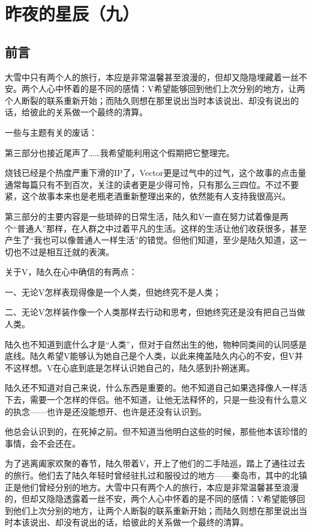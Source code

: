 \chapter{昨夜的星辰（九）}

\section*{前言}

大雪中只有两个人的旅行，本应是非常温馨甚至浪漫的，但却又隐隐埋藏着一丝不安。两个人心中怀着的是不同的感情：V希望能够回到他们上次分别的地方，让两个人断裂的联系重新开始；而陆久则想在那里说出当时本该说出、却没有说出的话，给彼此的关系做一个最终的清算。

\lineseparator

一些与主题有关的废话：

第三部分也接近尾声了……我希望能利用这个假期把它整理完。

烧钱已经是个热度严重下滑的IP了，Vector更是过气中的过气，这个故事的点击量通常每篇只有不到百次，关注的读者更是少得可怜，只有那么三四位。不过不要紧，这个故事本来也是老瓶老酒重新整理出来的，依然能有人支持我很高兴。

第三部分的主要内容是一些琐碎的日常生活，陆久和V一直在努力试着像是两个“普通人”那样，在人群之中过着平凡的生活。这样的生活让他们收获很多，甚至产生了“我也可以像普通人一样生活”的错觉。但他们知道，至少是陆久知道，这一切也不过是相互迁就的表演。

关于V，陆久在心中确信的有两点：

一、无论V怎样表现得像是一个人类，但她终究不是人类；

二、无论V怎样装作像一个人类那样去行动和思考，但她终究还是没有把自己当做人类。

陆久也不知道到底什么才是“人类”，但对于自然出生的他，物种同类间的认同感是底线。陆久希望V能够认为她自己是个人类，以此来掩盖陆久内心的不安，但V并不这样想。V在心底到底是怎样认识她自己的，陆久感到扑朔迷离。

陆久还不知道对自己来说，什么东西是重要的。他不知道自己如果选择像人一样活下去，需要一个怎样的伴侣。他不知道，让他无法释怀的，只是一些没有什么意义的执念——也许是还没能想开、也许是还没有认识到。

他总会认识到的，在死掉之前。但不知道当他明白这些的时候，那些他本该珍惜的事情，会不会还在。

为了逃离阖家欢聚的春节，陆久带着V，开上了他们的二手陆巡，踏上了通往过去的旅行。他们去了陆久年轻时曾经驻扎过和服役过的地方——秦岛市，其中的北镇正是他们曾经分别的地方。大雪中只有两个人的旅行，本应是非常温馨甚至浪漫的，但却又隐隐透露着一丝不安，两个人心中怀着的是不同的感情：V希望能够回到他们上次分别的地方，让两个人断裂的联系重新开始；而陆久则想在那里说出当时本该说出、却没有说出的话，给彼此的关系做一个最终的清算。

